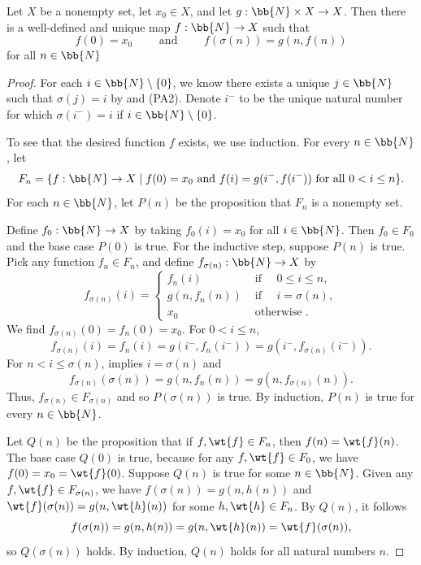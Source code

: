 \begin{theorem}\label{ch1thm_recur}
	Let $X$ be a nonempty set, let $x_{0}\in X$, and let $g:\bb{N}\times X\rightarrow X$.
	Then there is a well-defined and unique map $f:\bb{N}\rightarrow X$ such that
	\[ f(0) = x_{0} \qquad\text{ and }\qquad f(\sigma(n)) = g(n, f(n)) \]
	for all $n\in\bb{N}$
\end{theorem}
\fi %
\iffalse 
\begin{proof}
	For each $i\in\bb{N}\setminus\{0\}$, we know there exists a unique $j\in\bb{N}$ such that $\sigma(j) = i$ by  and (PA2).
	Denote $i^{-}$ to be the unique natural number for which $\sigma(i^{-}) = i$ if $i\in\bb{N}\setminus\{0\}$.
	
	To see that the desired function $f$ exists, we use induction.
	For every $n\in\bb{N}$, let 
	\[ F_{n} = \{ f:\bb{N}\rightarrow X \;|\; f(0) = x_{0} \text{ and } f(i) = g(i^{-}, f(i^{-})) \text{ for all } 0 < i \le n \}. \]
	For each $n\in\bb{N}$, let $P(n)$ be the proposition that $F_{n}$ is a nonempty set. 
	
	Define $f_{0}:\bb{N}\rightarrow X$ by taking $f_{0}(i) = x_{0}$ for all $i\in\bb{N}$.
	Then $f_{0}\in F_{0}$ and the base case $P(0)$ is true. 
	For the inductive step, suppose $P(n)$ is true.
	Pick any function $f_{n}\in F_{n}$, and define $f_{\sigma(n)}:\bb{N}\rightarrow X$ by
	\[ f_{\sigma(n)}(i) = \begin{cases}
		f_{n}(i) &\text{ if }\quad 0\le i \le n, \\
		g(n, f_{n}(n)) &\text{ if }\quad i = \sigma(n), \\
		x_{0} &\text{ otherwise }. 
	\end{cases} \]
	We find $f_{\sigma(n)}(0) = f_{n}(0) = x_{0}$.
	For $0 < i\le n$, 
	\[ f_{\sigma(n)}(i) = f_{n}(i) = g(i^{-}, f_{n}(i^{-})) = g(i^{-}, f_{\sigma(n)}(i^{-})). \]
	For $n < i\le \sigma(n)$,  implies $i = \sigma(n)$ and
	\[ f_{\sigma(n)}(\sigma(n)) = g(n, f_{n}(n)) = g(n, f_{\sigma(n)}(n)). \]
	Thus, $f_{\sigma(n)}\in F_{\sigma(n)}$ and so $P(\sigma(n))$ is true. 
	By induction, $P(n)$ is true for every $n\in\bb{N}$.
	
	Let $Q(n)$ be the proposition that if $f, \wt{f}\in F_{n}$, then $f(n) = \wt{f}(n)$. 
	The base case $Q(0)$ is true, because for any $f, \wt{f}\in F_{0}$, we have $f(0) = x_{0} = \wt{f}(0)$. 
	Suppose $Q(n)$ is true for some $n\in\bb{N}$.
	Given any $f, \wt{f}\in F_{\sigma(n)}$, we have $f(\sigma(n)) = g(n, h(n))$ and $\wt{f}(\sigma(n)) = g(n, \wt{h}(n))$ for some $h, \wt{h}\in F_{n}$. 
	By $Q(n)$, it follows 
	\[ f(\sigma(n)) = g(n, h(n)) = g(n, \wt{h}(n)) = \wt{f}(\sigma(n)), \]
	so $Q(\sigma(n))$ holds. 
	By induction, $Q(n)$ holds for all natural numbers $n$. 
	

\end{proof}
